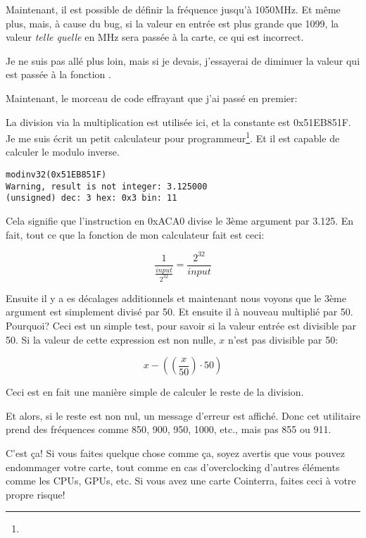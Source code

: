 Maintenant, il est possible de définir la fréquence jusqu'à 1050MHz. Et même plus,
mais, à cause du bug, si la valeur en entrée est plus grande que 1099, la valeur
\emph{telle quelle} en MHz sera passée à la carte, ce qui est incorrect.

Je ne suis  pas allé plus loin, mais si je devais, j'essayerai de diminuer la valeur
qui est passée à la fonction .

Maintenant, le morceau de code effrayant que j'ai passé en premier:



La division via la multiplication est utilisée ici, et la constante est 0x51EB851F.
Je me suis écrit un petit calculateur pour programmeur\footnote{\ProgCalcURL}.
Et il est capable de calculer le modulo inverse.

\begin{lstlisting}
modinv32(0x51EB851F)
Warning, result is not integer: 3.125000
(unsigned) dec: 3 hex: 0x3 bin: 11
\end{lstlisting}

Cela signifie que l'instruction  en 0xACA0 divise le 3ème argument par 3.125.
En fait, tout ce que la fonction  de mon calculateur fait est ceci:

\[
\frac{1}{\frac{input}{2^{32}}} = \frac{2^{32}}{input}
\]

Ensuite il y a es décalages additionnels et maintenant nous voyons que le 3ème argument
est simplement divisé par 50.
Et ensuite il à nouveau multiplié par 50.
Pourquoi?
Ceci est un simple test, pour savoir si la valeur entrée est divisible par 50.
Si la valeur de cette expression est non nulle, $x$ n'est pas divisible par 50:

\[
x-((\frac{x}{50}) \cdot 50)
\]

Ceci est en fait une manière simple de calculer le reste de la division.

Et alors, si le reste est non nul, un message d'erreur est affiché.
Donc cet utilitaire prend des fréquences comme 850, 900, 950, 1000, etc., mais pas 855 ou 911.

C'est ça! Si vous faites quelque chose comme ça, soyez avertis que vous pouvez endommager
votre carte, tout comme en cas d'overclocking d'autres éléments comme les \ac{CPU}s,
\ac{GPU}s, etc.
Si vous avez une carte Cointerra, faites ceci à votre propre risque!

